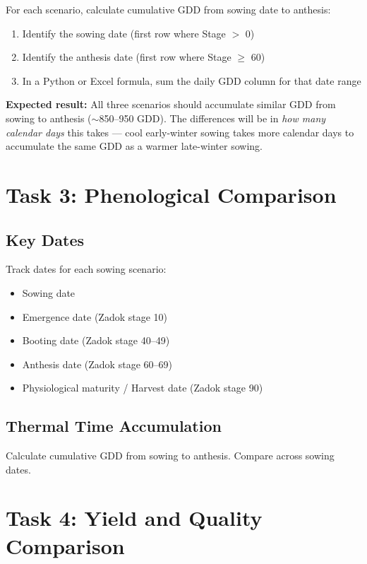 For each scenario, calculate cumulative GDD from sowing date to anthesis:
\begin{enumerate}
  \item Identify the sowing date (first row where Stage $>$ 0)
  \item Identify the anthesis date (first row where Stage $\geq$ 60)
  \item In a Python or Excel formula, sum the daily GDD column for that date range
\end{enumerate}

\begin{keyconceptbox}
\textbf{Expected result:} All three scenarios should accumulate similar GDD from sowing to anthesis ($\sim$850--950 GDD). The differences will be in \emph{how many calendar days} this takes --- cool early-winter sowing takes more calendar days to accumulate the same GDD as a warmer late-winter sowing.
\end{keyconceptbox}

\section{Task 3: Phenological Comparison}

\subsection{Key Dates}

Track dates for each sowing scenario:
\begin{itemize}
  \item Sowing date
  \item Emergence date (Zadok stage 10)
  \item Booting date (Zadok stage 40--49)
  \item Anthesis date (Zadok stage 60--69)
  \item Physiological maturity / Harvest date (Zadok stage 90)
\end{itemize}

\subsection{Thermal Time Accumulation}

Calculate cumulative GDD from sowing to anthesis. Compare across sowing dates.

\section{Task 4: Yield and Quality Comparison}

